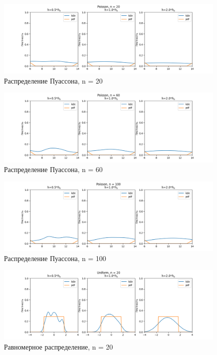\documentclass[12pt]{article}
\begin{document}
\begin{figure}
  \centering
  \includegraphics[width=0.8\paperwidth ]{images/kde/Poisson_20.png}
  \caption{Распределение Пуассона, n = 20}
\end{figure}

\begin{figure}
  \centering
  \includegraphics[width=0.8\paperwidth ]{images/kde/Poisson_60.png}
  \caption{Распределение Пуассона, n = 60}
\end{figure}

\begin{figure}
  \centering
  \includegraphics[width=0.8\paperwidth ]{images/kde/Poisson_100.png}
  \caption{Распределение Пуассона, n = 100}
\end{figure}

\begin{figure}
  \centering
  \includegraphics[width=0.8\paperwidth ]{images/kde/Uniform_20.png}
  \caption{Равномерное распределение, n = 20}
\end{figure}
\end{document}
